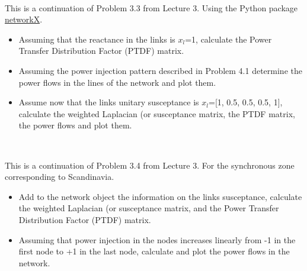 \documentclass[10pt]{article}
\newenvironment{problem}[2][Problem]{\begin{trivlist}
\item[\hskip \labelsep {\bfseries #1}\hskip \labelsep {\bfseries #2.}]}{\end{trivlist}}
\begin{document}
\


\begin{problem}{4.3}
This is a continuation of Problem 3.3 from Lecture 3.
Using the Python package \href{https://networkx.org/}{networkX}.

\begin{itemize}
\item[a)] Assuming that the reactance in the links is $x_l$=1, calculate the Power Transfer Distribution Factor (PTDF) matrix.

\item[b)] Assuming the power injection pattern described in Problem 4.1 determine the power flows in the lines of the network and plot them.

\item[c)] Assume now that the links unitary susceptance is $x_{l}$=[1, 0.5, 0.5, 0.5, 1], calculate the weighted Laplacian (or susceptance matrix,  the PTDF matrix, the power flows and plot them. 

\end{itemize}

\end{problem}

\

\begin{problem}{4.4}
This is a continuation of Problem 3.4 from Lecture 3. For the synchronous zone corresponding to Scandinavia.

\begin{itemize}
\item[a)] Add to the network object the information on the links susceptance, calculate the weighted Laplacian (or susceptance matrix, and the Power Transfer Distribution Factor (PTDF) matrix.

\item[b)] Assuming that power injection in the nodes increases linearly from -1 in the first node to +1 in the last node, calculate and plot the power flows in the network.

\end{itemize}

\end{problem}

\end{document}
